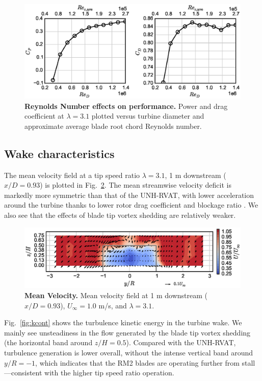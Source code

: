 \documentclass[10pt,letterpaper]{article}
\begin{document}
\begin{figure}[h]
    \includegraphics[width=\textwidth]{figures/perf_re_dep}

    \caption{{\bf Reynolds Number effects on performance.} Power and drag
        coefficient at $\lambda=3.1$ plotted versus turbine diameter and approximate
        average blade root chord Reynolds number.}

    \label{fig:cp-re-dep}
\end{figure}


\subsection*{Wake characteristics}

The mean velocity field at a tip speed ratio $\lambda=3.1$, 1 m downstream
($x/D=0.93$) is plotted in Fig.~\ref{fig:meancontquiv}. The mean streamwise
velocity deficit is markedly more symmetric than that of the UNH-RVAT, with
lower acceleration around the turbine thanks to lower rotor drag coefficient and
blockage ratio \cite{Bachant2015-JoT}. We also see that the effects of blade tip
vortex shedding are relatively weaker.

\begin{figure}[h]
\includegraphics[width=\textwidth]{figures/meancontquiv}
\caption{{\bf Mean Velocity.}
Mean velocity field at 1 m downstream ($x/D=0.93$), $U_\infty=1.0$ m/s, and
$\lambda=3.1$.}
\label{fig:meancontquiv}
\end{figure}


Fig.~\ref{fig:kcont} shows the turbulence kinetic energy in the turbine wake. We
mainly see unsteadiness in the flow generated by the blade tip vortex shedding
(the horizontal band around $z/H=0.5$). Compared with the UNH-RVAT, turbulence
generation is lower overall, without the intense vertical band around $y/R=-1$,
which indicates that the RM2 blades are operating further from
stall---consistent with the higher tip speed ratio operation.
\end{document}
